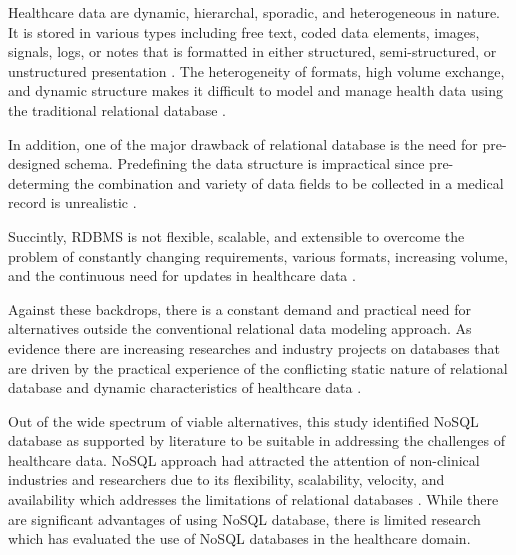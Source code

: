 \documentclass[5p]{elsarticle}
\begin{document}
Healthcare data are dynamic, hierarchal, sporadic, and heterogeneous in nature. 
It is stored in various types including free text, coded data elements, images, signals, logs, or notes that is formatted in either structured, semi-structured, 
or unstructured presentation \cite{M.Ercan190510,K.Lee201299,C.S.Kruse201638,S.White201413,S.Wasan1192016}.
The heterogeneity of formats, high volume exchange, and dynamic structure makes it difficult to model and manage health 
data using the traditional relational database \cite{K.Lee201299,H.Al-Fatlawi2015122,O.Schmitt20121,Y.Jin2011288}.

In addition, one of the major drawback of relational database is the need for pre-designed schema. 
Predefining the data structure is impractical since pre-determing the combination and variety of data fields to be collected in a medical record is unrealistic \cite{K.Lee201299}. 

Succintly, RDBMS is not flexible, scalable, and extensible to overcome the problem of constantly changing requirements, various formats, increasing volume, and the continuous need for updates in healthcare data \cite{Z.Goli-Malekabadi201675,K.Lee201299,H.Al-Fatlawi2015122,O.Schmitt20121,Y.Jin2011288}.

Against these backdrops, there is a constant demand and practical need for alternatives outside the conventional relational data modeling approach. 
As evidence there are increasing researches and industry projects on databases that are driven by the practical experience of the conflicting static 
nature of relational database and dynamic characteristics of healthcare data \cite{M.Ercan190510}.

Out of the wide spectrum of viable alternatives, this study identified NoSQL database as supported by literature to be suitable in addressing the challenges of 
healthcare data. NoSQL approach had attracted the attention of non-clinical industries \cite{C.S.Kruse201638,Z.Parker20131,G.D.Ferreira2013125} and researchers 
due to its flexibility, scalability, velocity, and availability which addresses the limitations of relational databases \cite{M.Ercan190510}. 
While there are significant advantages of using NoSQL database, there is limited research which has evaluated the use of NoSQL databases in the healthcare domain.
\end{document}
